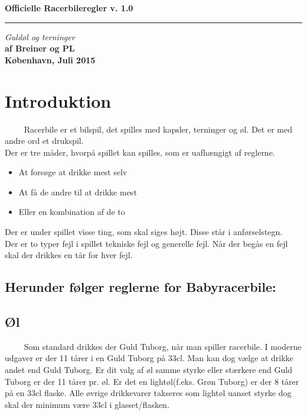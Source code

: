 \documentclass[12pt]{article}
\begin{document}
 \begin{flushright}
  {\Huge\bfseries Officielle Racerbileregler v. 1.0}\\
  \rule{\textwidth}{2pt}
  {\large\itshape Guldøl og terninger}\\
  {\bfseries af Breiner og PL\\[4ex]
K\o benhavn, Juli 2015\\}
 \end{flushright}
 \thispagestyle{empty}
 \clearpage

\newpage

\section*{Introduktion}

$\qquad$ Racerbile er et bilspil, det spilles med kapsler, terninger og øl. Det er med andre ord et drukspil.\\
Der er tre måder, hvorpå spillet kan spilles, som er uafhængigt af reglerne.
\begin{itemize}
	\item At forsøge at drikke mest selv
	\item At få de andre til at drikke mest
	\item Eller en kombination af de to
\end{itemize}

Der er under spillet visse ting, som skal siges højt. Disse står i anførselstegn.\\

Der er to typer fejl i spillet tekniske fejl og generelle fejl. Når der begås en fejl skal der drikkes en tår for hver fejl.\\

\subsection*{Herunder følger reglerne for Babyracerbile:}

\subsection*{Øl}

$\qquad$ Som standard drikkes der Guld Tuborg, når man spiller racerbile. I moderne udgaver er der 11 tårer i en Guld Tuborg på 33cl. Man kan dog vælge at drikke andet end Guld Tuborg. Er dit valg af øl samme styrke eller stærkere end Guld Tuborg er der 11 tårer pr. øl. Er det en lightøl(f.eks. Grøn Tuborg) er der 8 tårer på en 33cl flaske. Alle øvrige drikkevarer takseres som lightøl uanset styrke dog skal der minimum være 33cl i glasset/flasken.
\end{document}
